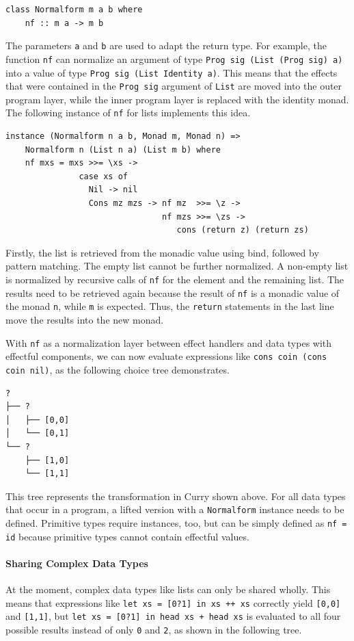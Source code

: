 \documentclass[a4paper, 11pt, fleqn, twoside, abstract=on]{scrreprt}
\newcommand{\hinl}[1]{\texttt{#1}}
\begin{document}
\begin{verbatim}
class Normalform m a b where
    nf :: m a -> m b
\end{verbatim}
\noindent
The parameters \hinl{a} and \hinl{b} are used to adapt the return type.
For example, the function \hinl{nf} can normalize an argument of type \hinl{Prog sig (List (Prog sig) a)} into a value of type \hinl{Prog sig (List Identity a)}.
This means that the effects that were contained in the \hinl{Prog sig} argument of \hinl{List} are moved into the outer program layer, while the inner program layer is replaced with the identity monad.
The following instance of \hinl{nf} for lists implements this idea.

\begin{verbatim}
instance (Normalform n a b, Monad m, Monad n) =>
    Normalform n (List n a) (List m b) where
    nf mxs = mxs >>= \xs ->
               case xs of
                 Nil -> nil
                 Cons mz mzs -> nf mz  >>= \z ->
                                nf mzs >>= \zs ->
                                   cons (return z) (return zs)
\end{verbatim}
\noindent
Firstly, the list is retrieved from the monadic value using bind, followed by pattern matching.
The empty list cannot be further normalized.
A non-empty list is normalized by recursive calls of \hinl{nf} for the element and the remaining list.
The results need to be retrieved again because the result of \hinl{nf} is a monadic value of the monad \hinl{n}, while \hinl{m} is expected.
Thus, the \hinl{return} statements in the last line move the results into the new monad.

With \hinl{nf} as a normalization layer between effect handlers and data types with effectful components, we can now evaluate expressions like \hinl{cons coin (cons coin nil)}, as the following choice tree demonstrates.

\begin{verbatim}
? 
├── ? 
│   ├── [0,0]
│   └── [0,1]
└── ? 
    ├── [1,0]
    └── [1,1]
\end{verbatim}
\noindent
This tree represents the transformation in Curry shown above.
For all data types that occur in a program, a lifted version with a \hinl{Normalform} instance needs to be defined.
Primitive types require instances, too, but can be simply defined as \hinl{nf = id} because primitive types cannot contain effectful values.

\paragraph{Sharing Complex Data Types}
At the moment, complex data types like lists can only be shared wholly.
This means that expressions like \hinl{let xs = [0?1] in xs ++ xs} correctly yield \hinl{[0,0]} and \hinl{[1,1]}, but \hinl{let xs = [0?1] in head xs + head xs} is evaluated to all four possible results instead of only \hinl{0} and \hinl{2}, as shown in the following tree.
\end{document}
